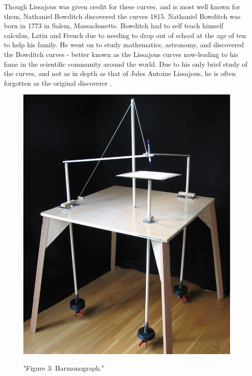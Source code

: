 Though Lissajous was given credit for these curves, and is most well known for them, Nathaniel Bowditch discovered the curves 1815. Nathaniel Bowditch was born in 1773 in Salem, Massachusetts. Bowditch had to self teach himself calculus, Latin and French due to needing to drop out of school at the age of ten to help his family. He went on to study mathematics, astronomy, and discovered the Bowditch curves - better known as the Lissajous curves now-leading to his fame in the scientific community around the world. Due to his only brief study of the curves, and not as in depth as that of Jules Antoine Lissajous, he is often forgotten as the original discoverer \cite{NathanielBowditch}.
\begin{figure}[h]
    \centering
    \includegraphics[scale=0.3]{Images/harmonograph.jpg}
    \cite{Harmpic}
    \caption{"Figure 3: Harmonograph."}
    \label{fig:my_label}
\end{figure}

